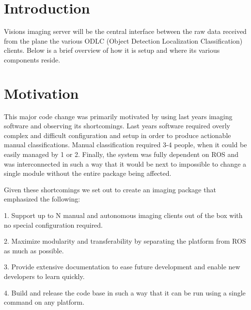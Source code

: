 \documentclass[]{auvsi_doc}
\begin{document}
\begin{AUVSITitlePage}
\begin{artifacttable}
\end{artifacttable}
\end{AUVSITitlePage}

\section{Introduction}

Visions imaging server will be the central interface between the raw data received from the plane 
the various ODLC (Object Detection Localization Classification) clients. Below is a brief overview of how it is setup and where its various components reside.

\section{Motivation}

This major code change was primarily motivated by using last years imaging
software and observing its shortcomings. Last years software required overly 
complex and difficult configuration and setup in order to produce actionable 
manual classifications. Manual classification  required 3-4 people, when it 
could be easily managed by 1 or 2. Finally, the system was fully dependent 
on ROS and was interconnected in such a way that it would be next to impossible to change
a single module without the entire package being affected.

Given these shortcomings we set out to create an imaging package that emphasized
the following:

1. Support up to N manual and autonomous imaging clients out of the box with no 
special configuration required.

2. Maximize modularity and transferability by separating the platform from ROS as 
much as possible.

3. Provide extensive documentation to ease future development and enable new developers
to learn quickly.

4. Build and release the code base in such a way that it can be run using a single command
on any platform.
\end{document}
